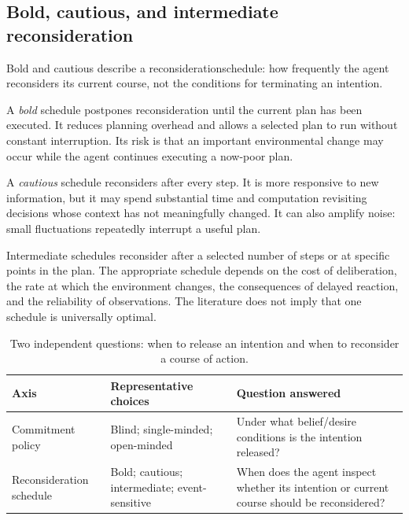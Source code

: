 \subsection{Bold, cautious, and intermediate reconsideration}

Bold and cautious describe a \gls{reconsiderationschedule}: how frequently the agent reconsiders its current course, not the conditions for terminating an intention.

A \emph{bold} schedule postpones reconsideration until the current plan has been executed. It reduces planning overhead and allows a selected plan to run without constant interruption. Its risk is that an important environmental change may occur while the agent continues executing a now-poor plan.

A \emph{cautious} schedule reconsiders after every step. It is more responsive to new information, but it may spend substantial time and computation revisiting decisions whose context has not meaningfully changed. It can also amplify noise: small fluctuations repeatedly interrupt a useful plan.

Intermediate schedules reconsider after a selected number of steps or at specific points in the plan. The appropriate schedule depends on the cost of deliberation, the rate at which the environment changes, the consequences of delayed reaction, and the reliability of observations. The literature does not imply that one schedule is universally optimal.\autocite{kinny1991commitment}

\begin{table}[tbp]
\centering
\caption{Two independent questions: when to release an intention and when to reconsider a course of action.}
\label{tab:ch15-two-axes}
\begin{tabularx}{\textwidth}{>{\RaggedRight\arraybackslash}p{}>{\RaggedRight\arraybackslash}X>{\RaggedRight\arraybackslash}X}
\toprule
\textbf{Axis} & \textbf{Representative choices} & \textbf{Question answered} \\
\midrule
Commitment policy & Blind; single-minded; open-minded & Under what belief/desire conditions is the intention released? \\
Reconsideration schedule & Bold; cautious; intermediate; event-sensitive & When does the agent inspect whether its intention or current course should be reconsidered? \\
\bottomrule
\end{tabularx}
\end{table}

